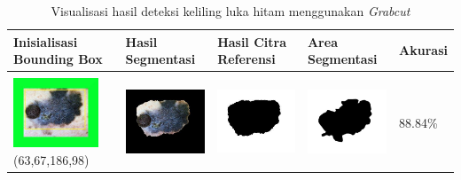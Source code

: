 \begin{table}[H]
	\centering
	\caption{Visualisasi hasil deteksi keliling luka hitam menggunakan \emph{Grabcut}}
	\label{tabel_hasil_3}
	\begin{tabular}{|m{1.0in}|m{1.0in}|m{1.0in}|m{1.0in}|m{0.6in}|}
		\hline
		\textbf{Inisialisasi Bounding Box} & \textbf{Hasil Segmentasi} & \textbf{Hasil Citra Referensi} & \textbf{Area Segmentasi} & \textbf{Akurasi} \\
		\hline

		&  &  & \\
		\includegraphics[width=1.0in]{gambar/hasil_segmentasi/luka_hitam/image_27_rect.jpg} {\centering\fontsize{10}{10}\selectfont(63,67,186,98)}&
		\includegraphics[width=1.0in]{gambar/hasil_segmentasi/luka_hitam/result_27.jpg}&
		\includegraphics[width=1.0in]{gambar/hasil_segmentasi/luka_hitam/mask_r_27.jpg}&
		\includegraphics[width=1.0in]{gambar/hasil_segmentasi/luka_hitam/27_r.jpg}&
		88.84\% \\
		\hline 
				

\end{tabular}
\end{table}
